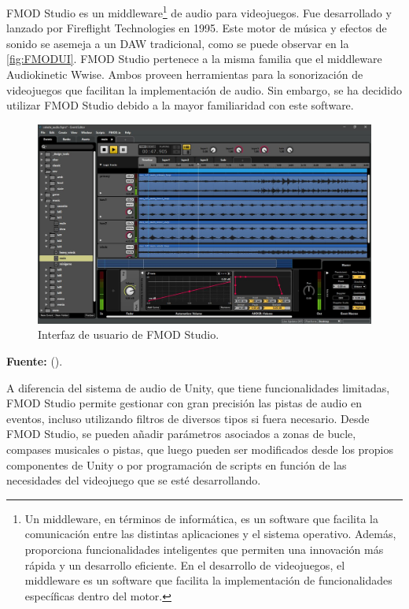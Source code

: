 FMOD Studio es un middleware\footnote{Un middleware, en términos de informática, es un software que facilita la comunicación entre las distintas aplicaciones y el sistema operativo. Además, proporciona funcionalidades inteligentes que permiten una innovación más rápida y un desarrollo eficiente. En el desarrollo de videojuegos, el middleware es un software que facilita la implementación de funcionalidades específicas dentro del motor.} de audio para videojuegos. Fue desarrollado y lanzado por Fireflight Technologies en 1995. Este motor de música y efectos de sonido se asemeja a un DAW tradicional, como se puede observar en la \autoref{fig:FMODUI}. FMOD Studio pertenece a la misma familia que el middleware Audiokinetic Wwise. Ambos proveen herramientas para la sonorización de videojuegos que facilitan la implementación de audio. Sin embargo, se ha decidido utilizar FMOD Studio debido a la mayor familiaridad con este software.

\begin{figure}[h!]
	\centering
	\includegraphics[width=0.9\linewidth]{./Figuras/Aspectos/FMODStudio.jpg}
	\caption{Interfaz de usuario de FMOD Studio.}
	\label{fig:FMODUI}
	\vspace{-30pt}
\end{figure}

\begin{center}
	\textbf{Fuente:} \citeauthor{FMODSTUDIO:2024} (\citeyear{FMODSTUDIO:2024}).
\end{center}

A diferencia del sistema de audio de Unity, que tiene funcionalidades limitadas, FMOD Studio permite gestionar con gran precisión las pistas de audio en eventos, incluso utilizando filtros de diversos tipos si fuera necesario. Desde FMOD Studio, se pueden añadir parámetros asociados a zonas de bucle, compases musicales o pistas, que luego pueden ser modificados desde los propios componentes de Unity o por programación de scripts en función de las necesidades del videojuego que se esté desarrollando.

